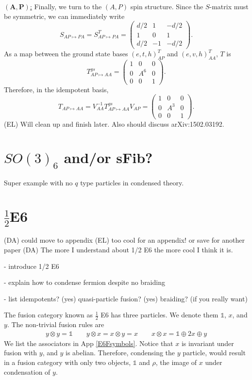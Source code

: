 \documentclass[12pt,a4paper]{article}
\newcommand{\tp}{\otimes}
\newcommand\be            {\begin{equation}}
\newcommand\ee            {\end{equation}}
\newcommand{\dave}[1]{{\color{ao(english)}\footnotesize{(DA) #1}}}
\newcommand{\ethan}[1]{{\color{amethyst}\footnotesize{(EL) #1}}}
\begin{document}
\underline{$\mathbf{(A,P)}$:} Finally, we turn to the $(A,P)$ spin structure. 
Since the $S$-matrix must be symmetric, we can immediately write 
\be S_{AP \mapsto PA} =  S_{AP \mapsto PA}^T = \begin{pmatrix}
d/2 & 1 & -d/2 \\ 1 & 0 & 1 \\ d/2 & -1 & -d/2
\end{pmatrix}.\ee
As a map between the ground state bases $(e,t,h)^T_{AP}$ and $(e,v,h)^T_{AA}$, $T$ is 
\be T^{gs}_{AP \mapsto AA} = \begin{pmatrix}
1 &0&0 \\ 0&A^6 &0\\0&0&1
\end{pmatrix}.\ee
Therefore, in the idempotent basis, 
\be T_{AP\mapsto AA} = V_{AA}^{-1} T^{gs}_{AP\mapsto AA} V_{AP} = \begin{pmatrix}
1 &0&0 \\ 0&A^3&0\\0&0&1
\end{pmatrix}.\ee
\ethan{Will clean up and finish later. Also should discuss arXiv:1502.03192}. 






\section{$SO(3)_6$ and/or sFib?}
Super example with no $q$ type particles in condensed theory.

\section{$\frac{1}{2}$E6} \label{e6}

\dave{could move to appendix \ethan{too cool for an appendix!} or save for another paper}
\dave{The more I understand about 1/2 E6 the more cool I think it is.}

- introduce 1/2 E6

- explain how to condense fermion despite no braiding

- list idempotents? (yes) quasi-particle fusion? (yes) braiding? (if you really want) 

The fusion category known as $\frac{1}{2}$ E6 has three particles. We denote them $\mathds{1}$, $x$, and $y$. 
The non-trivial fusion rules are
\begin{align}
y \tp y = \mathds{1} \quad \quad y \tp x = x \tp y = x \quad \quad x\tp x = \mathds{1}\oplus 2x \oplus y
\end{align}
We list the associators in App \ref{E6Fsymbols}.
Notice that $x$ is invariant under fusion with $y$, and $y$ is abelian. 
Therefore, condensing the $y$ particle, would result in a fusion category with only two objects, $\mathds{1}$ and $\rho$, the image of $x$ under condensation of $y$.
\end{document}
